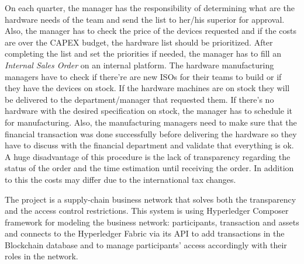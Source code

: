 On each quarter, the manager has the responsibility of determining what are the hardware needs of the team and send the list to her/his superior for approval.
Also, the manager has to check the price of the devices requested and if the costs are over the CAPEX budget, the hardware list should be prioritized. 
After completing the list and set the priorities if needed, the manager has to fill an \emph{Internal Sales Order} on an internal platform. 
The hardware manufacturing managers have to check if there're are new ISOs for their teams to build or if they have the devices on stock. If the hardware machines are on stock they will be delivered to the department/manager that requested them. If there's no hardware with the desired specification on stock, the manager has to schedule it for manufacturing.
Also, the manufacturing managers need to make sure that the financial transaction was done successfully before delivering the hardware so they have to discuss with the financial department and validate that everything is ok.
A huge disadvantage of this procedure is the lack of transparency regarding the status of the order and the time estimation until receiving the order.
In addition to this the costs may differ due to the international tax changes. 

The \textbf{\emph{{\project}}} project is a supply-chain business network that solves both the transparency and the access control restrictions.
This system is using Hyperledger Composer framework for modeling the business network: participants, transaction and assets and connects to the Hyperledger Fabric via its API to add transactions in the Blockchain database and to manage participants' access accordingly with their roles in the network.















